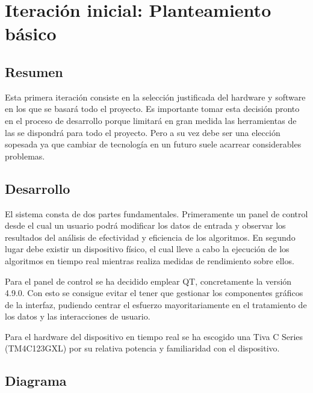 
\section{Iteración inicial: Planteamiento básico}
        \subsection{Resumen}
        
        Esta primera iteración consiste en la selección justificada del hardware y software en los que se basará todo el proyecto. Es importante tomar esta decisión pronto en el proceso de desarrollo porque limitará en gran medida las herramientas de las se dispondrá para todo el proyecto. Pero a su vez debe ser una elección sopesada ya que cambiar de tecnología en un futuro suele acarrear considerables problemas.
        
        \subsection{Desarrollo}

        El sistema consta de dos partes fundamentales. Primeramente un panel de control desde el cual un usuario podrá modificar los datos de entrada y observar los resultados del análisis de efectividad y eficiencia de los algoritmos. En segundo lugar debe existir un dispositivo físico, el cual lleve a cabo la ejecución de los algoritmos en tiempo real mientras realiza medidas de rendimiento sobre ellos.

        Para el panel de control se ha decidido emplear QT, concretamente la versión 4.9.0. Con esto se consigue evitar el tener que gestionar los componentes gráficos de la interfaz, pudiendo centrar el esfuerzo mayoritariamente en el tratamiento de los datos y las interacciones de usuario.
        
        Para el hardware del dispositivo en tiempo real se ha escogido una Tiva C Series (TM4C123GXL) por su relativa potencia y familiaridad con el dispositivo.        

        \subsection{Diagrama}

